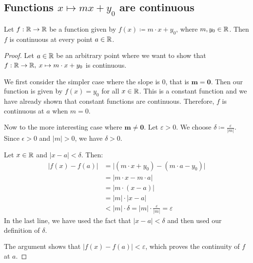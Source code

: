 \subsection{Functions $x \mapsto mx + y_0$ are continuous}

\begin{theorem}
   Let $f: \mathbb{R} \to \mathbb{R}$ be a function given by $f(x) \coloneqq m \cdot x + y_0$, where $m, y_0 \in \mathbb{R}$. Then $f$ is continuous at every point $a \in \mathbb{R}$.
\end{theorem}

\begin{proof}
   Let $a \in \mathbb{R}$ be an arbitrary point where we want to show that $f: \mathbb{R} \to \mathbb{R}, \: x \mapsto m\cdot x + y_0$ is continuous.

   We first consider the simpler case where the slope is $0$, that is $\mathbf{m = 0}$. Then our function is given by $f(x) = y_0$ for all $x \in \mathbb{R}$. This is a constant function and we have already shown that constant functions are continuous. Therefore, $f$ is continuous at $a$ when $m = 0$.

   Now to the more interesting case where $\mathbf{m \neq 0}$. Let $\varepsilon > 0$. We choose $\delta \coloneqq \frac{\varepsilon}{|m|}$. Since $\epsilon > 0$ and $|m| > 0$, we have $\delta > 0$.

   Let $x \in \mathbb{R}$ and $|x-a| < \delta$. Then:
   \begin{align*}
      |f(x) - f(a)| &= \bigl|(m \cdot x + y_0) - (m \cdot a - y_0)\bigr| \\
      &= |m \cdot x - m \cdot a| \\
      &= |m \cdot (x - a)| \\
      &= |m| \cdot |x - a| \\
      &< |m| \cdot \delta
      = |m| \cdot \frac{\varepsilon}{|m|} = \varepsilon
   \end{align*}
   In the last line, we have used the fact that $|x - a| < \delta$ and then used our definition of $\delta$.

   The argument shows that $|f(x) - f(a)| < \varepsilon$, which proves the continuity of $f$ at $a$.
\end{proof}

